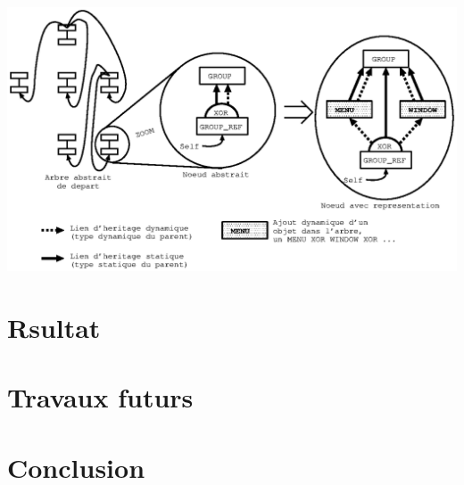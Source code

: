 \documentclass[fleqn]{article-hermes}
\begin{document}
\begin{center}
\includegraphics[scale=1.0]{figures/GUII.ps}
\end{center}

\section{Rsultat}

\section{Travaux futurs}

\section{Conclusion}
\end{document}
